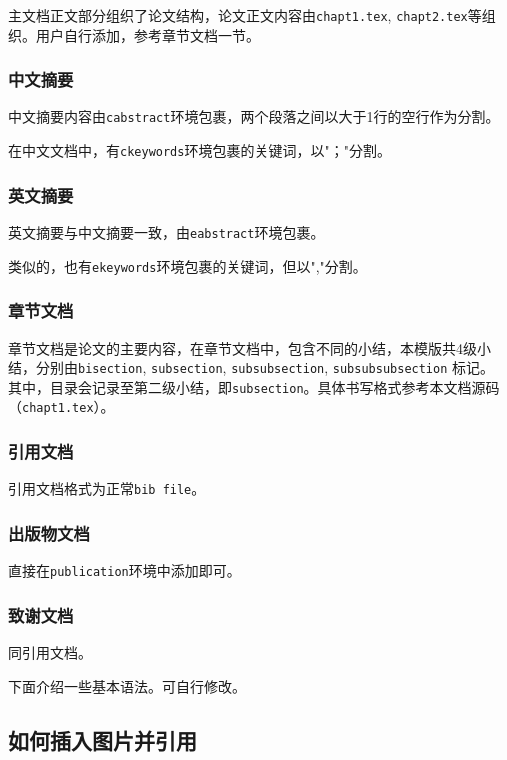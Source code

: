 主文档正文部分组织了论文结构，论文正文内容由\verb |chapt1.tex|, \verb|chapt2.tex|等组织。用户自行添加，参考章节文档一节。%

\subsubsection{中文摘要}

中文摘要内容由\verb|cabstract|环境包裹，两个段落之间以大于1行的空行作为分割。

在中文文档中，有\verb|ckeywords|环境包裹的关键词，以"；"分割。

\subsubsection{英文摘要}

 英文摘要与中文摘要一致，由\verb|eabstract|环境包裹。

 类似的，也有\verb|ekeywords|环境包裹的关键词，但以","分割。

 \subsubsection{章节文档}
 章节文档是论文的主要内容，在章节文档中，包含不同的小结，本模版共4级小结，分别由\verb|bisection|, \verb|subsection|, \verb|subsubsection|,  \verb|subsubsubsection| 标记。
 其中，目录会记录至第二级小结，即\verb|subsection|。具体书写格式参考本文档源码（\verb|chapt1.tex|）。

\subsubsection{引用文档}

引用文档格式为正常\verb|bib file|。

\subsubsection{出版物文档}

直接在\verb|publication|环境中添加即可。

\subsubsection{致谢文档}

同引用文档。

下面介绍一些基本语法。可自行修改。
\subsection{如何插入图片并引用}

